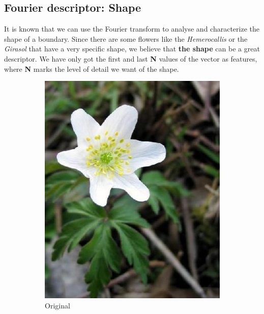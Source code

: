 \documentclass[11]{article}
\begin{document}
\subsection{Fourier descriptor: Shape}
It is known that we can use the Fourier transform to analyse and characterize the shape of a boundary. Since there are some flowers like the \textit{Hemerocallis} or the \textit{Girasol} that have a very specific shape, we believe that \textbf{the shape} can be a great descriptor.  We have only got the first and last \textbf{N} values of the vector as features, where \textbf{N} marks the level of detail we want of the shape.

\begin{figure}[H]
    \begin{subfigure}[t]{0.45\textwidth}
    \centering
  \includegraphics[scale=0.25]{images/originalfourier.jpg}
    \caption{Original}
    \label{originalfourier}
    \end{subfigure}
    \begin{subfigure}[t]{0.45\textwidth}
    \centering

\end{subfigure}
\end{figure}
\end{document}
